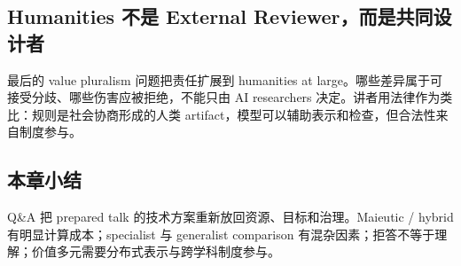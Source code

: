 \subsection{Humanities 不是 External Reviewer，而是共同设计者}

最后的 value pluralism 问题把责任扩展到 humanities at large。哪些差异属于可接受分歧、哪些伤害应被拒绝，不能只由 AI researchers 决定。讲者用法律作为类比：规则是社会协商形成的人类 artifact，模型可以辅助表示和检查，但合法性来自制度参与。

\subsection{本章小结}

Q\&A 把 prepared talk 的技术方案重新放回资源、目标和治理。Maieutic / hybrid 有明显计算成本；specialist 与 generalist comparison 有混杂因素；拒答不等于理解；价值多元需要分布式表示与跨学科制度参与。

